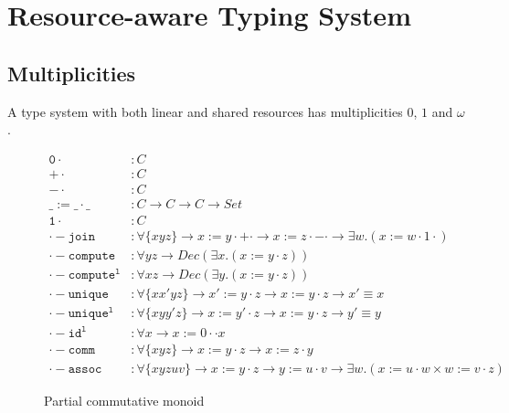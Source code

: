 \documentclass[a4paper,UKenglish,cleveref, autoref, thm-restate,authorcolumns]{lipics-v2019}
\newcommand{\op}[3]{#1 := #2 \cdot #3}
\newcommand{\constr}[1]{\mathtt{#1}}
\begin{document}
\section{Resource-aware Typing System}

\subsection{Multiplicities}

A type system with both linear and shared resources has multiplicities $0$, $1$ and $\omega$.

\begin{figure}[h]
\begin{equation}
\begin{split}
  \constr{0\cdot}          &: C \\
  \constr{+\cdot}          &: C \\
  \constr{-\cdot}          &: C \\
  \constr{\op{\_}{\_}{\_}} &: C \to C \to C \to Set \\
  \constr{1\cdot}          &: C \\
  \constr{\cdot-join}      &: \forall \{x y z\} \to \op{x}{y}{+\cdot} \to \op{x}{z}{-\cdot} \to \exists w . (\op{x}{w}{1\cdot}) \\
  \constr{\cdot-compute}   &: \forall y z \to Dec (\exists x . (\op{x}{y}{z})) \\
  \constr{\cdot-compute^l} &: \forall x z \to Dec (\exists y . (\op{x}{y}{z})) \\
  \constr{\cdot-unique}    &: \forall \{x x' y z\} \to \op{x'}{y}{z} \to \op{x}{y}{z} \to x' \equiv x \\
  \constr{\cdot-unique^l}  &: \forall \{x y y' z\} \to \op{x}{y'}{z} \to \op{x}{y}{z} \to y' \equiv y \\
  \constr{\cdot-id^l}      &: \forall x \to \op{x}{0\cdot}{x} \\
  \constr{\cdot-comm}      &: \forall \{x y z\} \to \op{x}{y}{z} \to \op{x}{z}{y} \\
  \constr{\cdot-assoc}     &: \forall \{x y z u v\} \to \op{x}{y}{z} \to \op{y}{u}{v} \to \exists w . (\op{x}{u}{w} \times \op{w}{v}{z})
\end{split}
\end{equation}
\caption{Partial commutative monoid}
\end{figure}
\end{document}
